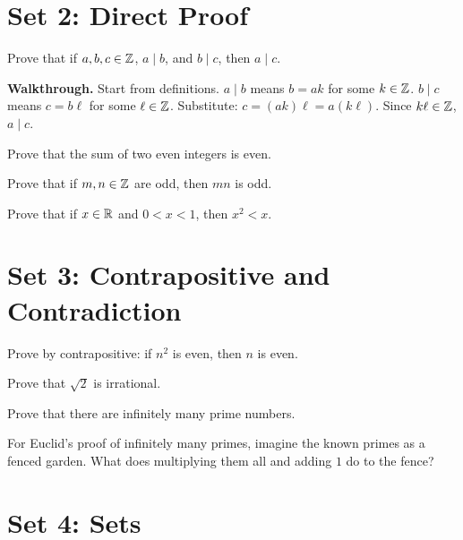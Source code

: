 \documentclass[11pt]{article}
\begin{document}
\section{Set 2: Direct Proof}

\begin{exercise}
Prove that if $a,b,c\in\mathbb{Z}$, $a\mid b$, and $b\mid c$, then $a\mid c$.
\end{exercise}

\textbf{Walkthrough.} Start from definitions. $a\mid b$ means $b=ak$ for some $k\in\mathbb{Z}$. $b\mid c$ means $c=b\ell$ for some $\ell\in\mathbb{Z}$. Substitute: $c=(ak)\ell=a(k\ell)$. Since $k\ell\in\mathbb{Z}$, $a\mid c$.

\begin{exercise}
Prove that the sum of two even integers is even.
\end{exercise}

\begin{exercise}
Prove that if $m,n\in\mathbb{Z}$ are odd, then $mn$ is odd.
\end{exercise}

\begin{exercise}
Prove that if $x\in\mathbb{R}$ and $0<x<1$, then $x^2<x$.
\end{exercise}

\section{Set 3: Contrapositive and Contradiction}

\begin{exercise}
Prove by contrapositive: if $n^2$ is even, then $n$ is even.
\end{exercise}

\begin{exercise}
Prove that $\sqrt{2}$ is irrational.
\end{exercise}

\begin{exercise}
Prove that there are infinitely many prime numbers.
\end{exercise}

\begin{walkbox}
For Euclid's proof of infinitely many primes, imagine the known primes as a fenced garden. What does multiplying them all and adding $1$ do to the fence?
\end{walkbox}

\section{Set 4: Sets}
\end{document}
